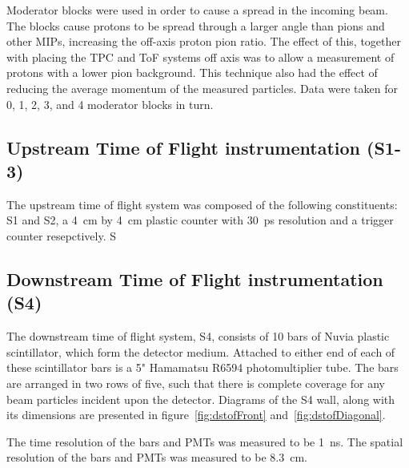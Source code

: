     Moderator blocks were used in order to cause a spread in the incoming beam.
    The blocks cause protons to be spread through a larger angle than pions and other MIPs, increasing the off-axis proton pion ratio.
    The effect of this, together with placing the TPC and ToF systems off axis was to allow a measurement of protons with a lower pion background.
    This technique also had the effect of reducing the average momentum of the measured particles.
    Data were taken for 0, 1, 2, 3, and 4 moderator blocks in turn.
    
 
    
	\subsection{Upstream Time of Flight instrumentation (S1-3)}
    The upstream time of flight system was composed of the following constituents:
    S1 and S2, a 4~cm by 4~cm plastic counter with 30~ps resolution and a trigger counter resepctively. 
    S

	\subsection{Downstream Time of Flight instrumentation (S4)}
	
    The downstream time of flight system, S4, consists of 10 bars of Nuvia plastic scintillator, which form the detector medium. Attached to either end of each of these scintillator bars is a 5" Hamamatsu R6594 photomultiplier tube. The bars are arranged in two rows of five, such that there is complete coverage for any beam particles incident upon the detector. Diagrams of the S4 wall, along with its dimensions are presented in figure~\ref{fig:dstofFront} and~\ref{fig:dstofDiagonal}.
    
    The time resolution of the bars and PMTs was measured to be 1~ns. The spatial resolution of the bars and PMTs was measured to be 8.3~cm.
    
